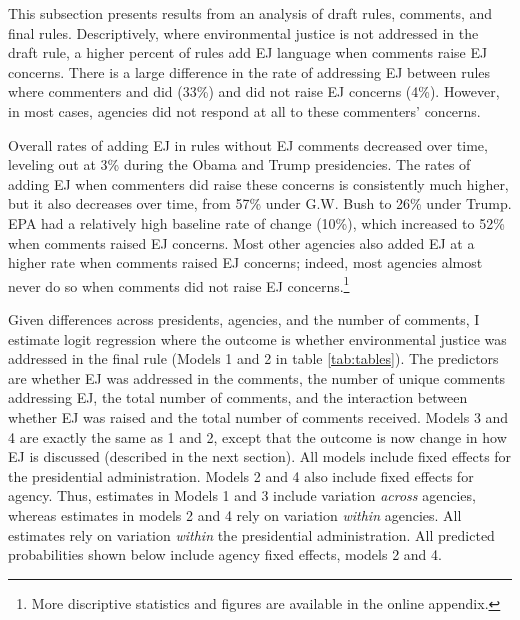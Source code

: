 \documentclass[
      12pt,
        ]{article}
\begin{document}
This subsection presents results from an analysis of draft
rules, comments, and final rules. Descriptively,
where environmental
justice is not addressed in the draft rule, a higher percent of rules add EJ language when comments raise EJ concerns. There is a large difference in the rate of addressing EJ between rules where commenters and did (33\%) and did not raise EJ concerns (4\%). However, in most cases, agencies did not respond at all to these commenters' concerns.

Overall rates of adding EJ in rules without EJ comments decreased over time, leveling out at 3\% during the Obama and Trump presidencies. The rates of adding EJ when commenters did raise these concerns is consistently much higher, but it also decreases over time, from 57\% under G.W. Bush to 26\% under Trump.
EPA had a relatively high baseline rate of change (10\%), which increased to 52\% when comments raised EJ concerns. Most other agencies also added EJ at a higher rate when comments raised EJ concerns; indeed, most agencies almost never do so when comments did not raise EJ concerns.\footnote{More discriptive statistics and figures are available in the online appendix.}

Given differences across presidents, agencies, and the number of comments, I estimate logit regression where the outcome is whether environmental justice was addressed in the final rule (Models 1 and 2 in table \ref{tab:tables}). The predictors are
whether EJ was addressed in the comments, the number of unique comments addressing EJ, the total number of comments, and the interaction between whether EJ was raised and the total number of comments received. Models 3 and 4 are exactly the same as 1 and 2, except that the outcome is now change in how EJ is discussed (described in the next section). All models include fixed effects for the presidential administration. Models 2 and 4 also include fixed effects for agency. Thus, estimates in Models 1 and 3 include variation \emph{across} agencies, whereas estimates in models 2 and 4 rely on variation \emph{within} agencies. All estimates rely on variation \emph{within} the presidential administration.
All predicted probabilities shown below include agency fixed effects, models 2 and 4.
\end{document}
